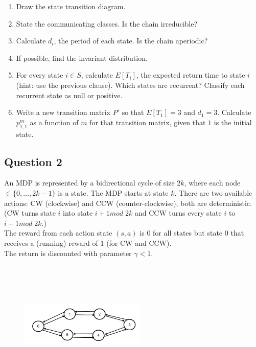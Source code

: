 \documentclass[11pt]{article}
\begin{document}
\begin{enumerate}
\item Draw the state transition diagram.
\item State the communicating classes. Is the chain irreducible?
\item Calculate $d_i$, the period of each state. Is the chain aperiodic?
\item If possible, find the invariant distribution.
\item For every state $i\in S$, calculate $E[T_i]$, the expected return time to state $i$ (hint: use the previous clause). Which states are recurrent? Classify each recurrent state as null or positive.
\item Write a new transition matrix $P'$ so that $E[T_1]=3$ and $d_1=3$. Calculate $p^{m}_{1,1}$ as a function of $m$ for that transition matrix, given that $1$ is the initial state.
\end{enumerate}
\newpage

\subsection{Question 2}
An MDP is represented by a bidirectional cycle of size $2k$, where each node $\in\{0,\dots,2k-1\}$ is a state. The MDP starts at state $k$.
There are two available actions: CW (clockwise) and CCW (counter-clockwise), both are deterministic. (CW turns state $i$ into state $i+1 mod\; 2k$ and CCW turns every state $i$ to $i-1 mod\; 2k$.)\\
The reward from each action state $(s,a)$ is $0$ for all states but state $0$ that receives a (running) reward of $1$ (for CW and CCW).\\
The return is discounted with parameter $\gamma<1$.

\begin{figure}[h]
\centering
\includegraphics[width=6cm,height=6cm,keepaspectratio]{mdp cw ccw fixed}
\end{figure}
\end{document}
